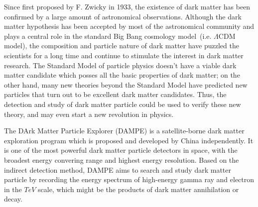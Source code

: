 \begin{eabstract}
Since first proposed by F. Zwicky in 1933, the existence of dark matter has been confirmed by a large amount of astronomical observations.
Although the dark matter hypothesis has been accepted by most of the astronomical community and plays a central role in the standard Big Bang cosmology model~(i.e. $\Lambda$CDM model), the composition and particle nature of dark matter have puzzled the scientists for a long time and continue to stimulate the interest in dark matter research.
The Standard Model of particle physics doesn't have a viable dark matter candidate which posses all the basic properties of dark matter; on the other hand, many new theories beyond the Standard Model have predicted new particles that turn out to be excellent dark matter candidates.
Thus, the detection and study of dark matter particle could be used to verify these new theory, and may even start a new revolution in physics.

The DArk Matter Particle Explorer (DAMPE) is a satellite-borne dark matter exploration program which is proposed and developed by China independently. It is one of the most powerful dark matter particle detectors in space, with the broadest energy convering range and highest energy resolution. Based on the indirect detection method, DAMPE aims to search and study dark matter particle by recording the energy spectrum of high-energy gamma ray and electron in the $TeV$ scale, which might be the products of dark matter annihilation or decay.


\end{eabstract}

